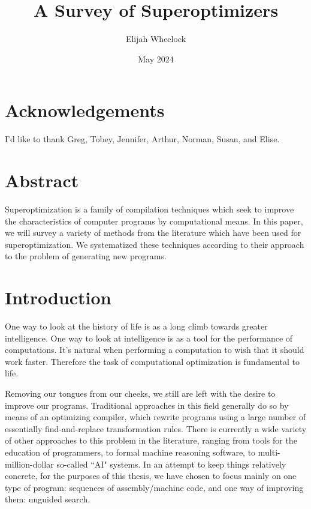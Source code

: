 \documentclass[12pt,twoside]{reedthesis}
\title{A Survey of Superoptimizers}
\author{Elijah Wheelock}
\date{May 2024}
\newcommand{\red}[1]{\textcolor{red}{#1}}
\begin{document}
\maketitle
\frontmatter %
\pagestyle{empty} %
\chapter*{Acknowledgements}
I'd like to thank Greg, Tobey, Jennifer, Arthur, Norman, Susan, and Elise.
\tableofcontents

\chapter*{Abstract}

    Superoptimization is a family of compilation techniques which seek to improve the characteristics of computer programs by computational means.
    In this paper, we will survey a variety of methods from the literature which have been used for superoptimization.
    We systematized these techniques according to their approach to the problem of generating new programs.

\mainmatter %
\pagestyle{fancyplain} %
\chapter*{Introduction}
    \singlespacing %
    
    
    One way to look at the history of life is as a long climb towards greater intelligence.
    One way to look at intelligence is as a tool for the performance of computations.
    It's natural when performing a computation to wish that it should work faster.
    Therefore the task of computational optimization is fundamental to life.
    
    Removing our tongues from our cheeks, we still are left with the desire to improve our programs. 
    Traditional approaches in this field generally do so by means of an optimizing compiler, which rewrite programs using a large number of essentially find-and-replace transformation rules.
    There is currently a wide variety of other approaches to this problem in the literature, ranging from tools for the education of programmers, to formal machine reasoning software, to multi-million-dollar so-called ``AI" systems.
    In an attempt to keep things relatively concrete, for the purposes of this thesis, we have chosen to focus mainly on one type of program: sequences of assembly/machine code, and one way of improving them: unguided search.
    
\end{document}
